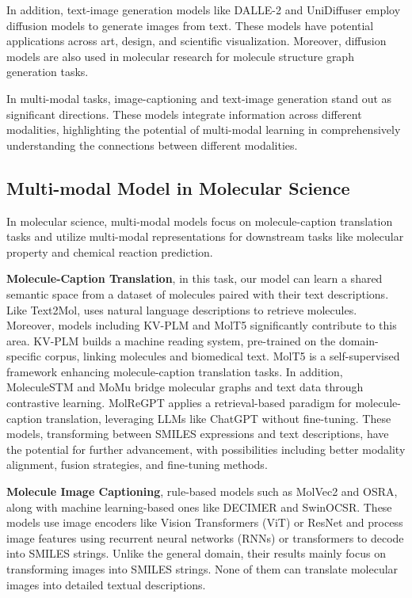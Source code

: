 \documentclass{article}
\begin{document}
In addition, text-image generation models like DALLE-2\cite{ramesh2022hierarchical} and UniDiffuser\cite{bao2023one} employ diffusion models\cite{yang2022diffusion} to generate images from text. These models have potential applications across art, design, and scientific visualization. Moreover, diffusion models are also used in molecular research for molecule structure graph generation tasks.

In multi-modal tasks, image-captioning and text-image generation stand out as significant directions. These models integrate information across different modalities, highlighting the potential of multi-modal learning in comprehensively understanding the connections between different modalities.

\subsection{Multi-modal Model in Molecular Science}
In molecular science, multi-modal models focus on molecule-caption translation tasks and utilize multi-modal representations for downstream tasks like molecular property and chemical reaction prediction.
 
\textbf{Molecule-Caption Translation}, in this task, our model can learn a shared semantic space from a dataset of molecules paired with their text descriptions. Like Text2Mol\cite{edwards2021text2mol}, uses natural language descriptions to retrieve molecules. Moreover, models including KV-PLM\cite{zeng2022deep} and MolT5\cite{edwards2022translation} significantly contribute to this area. KV-PLM builds a machine reading system, pre-trained on the domain-specific corpus, linking molecules and biomedical text. MolT5 is a self-supervised framework enhancing molecule-caption translation tasks. In addition, MoleculeSTM and MoMu bridge molecular graphs and text data through contrastive learning. MolReGPT applies a retrieval-based paradigm for molecule-caption translation, leveraging LLMs like ChatGPT without fine-tuning.
These models, transforming between SMILES expressions and text descriptions, have the potential for further advancement, with possibilities including better modality alignment, fusion strategies, and fine-tuning methods.

\textbf{Molecule Image Captioning}, rule-based models such as MolVec2\cite{peryea2019molvec} and OSRA\cite{filippov2009optical}, along with machine learning-based ones like DECIMER\cite{rajan2021decimer} and SwinOCSR. These models use image encoders like Vision Transformers (ViT)\cite{dosovitskiy2020image} or ResNet\cite{he2016deep} and process image features using recurrent neural networks (RNNs) or transformers\cite{vaswani2017attention} to decode into SMILES strings.
Unlike the general domain, their results mainly focus on transforming images into SMILES strings. None of them can translate molecular images into detailed textual descriptions.
 
\end{document}
